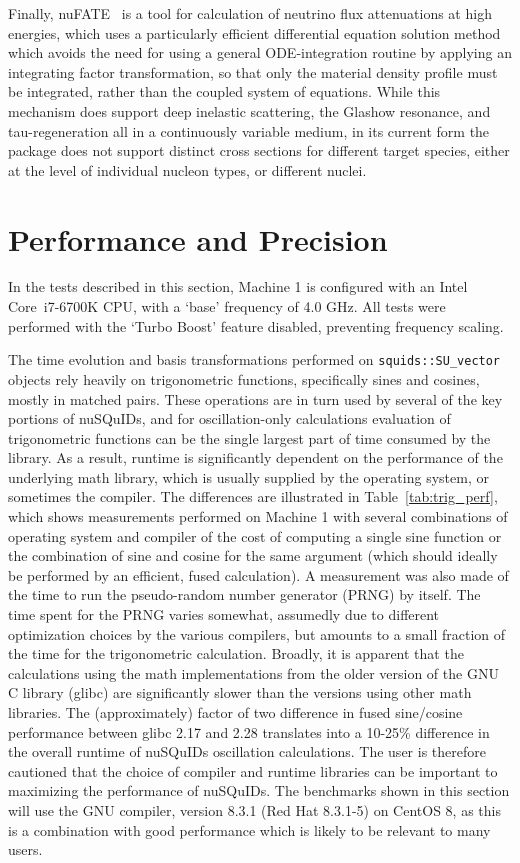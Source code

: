 \documentclass[3p,12pt]{elsarticle}
\newcommand{\ttf}{\ttfamily}
\begin{document}
Finally, nuFATE~\cite{nuFATE2017} is a tool for calculation of neutrino flux attenuations at high energies, which uses a particularly efficient differential equation solution method which avoids the need for using a general ODE-integration routine by applying an integrating factor transformation, so that only the material density profile must be integrated, rather than the coupled system of equations. 
While this mechanism does support deep inelastic scattering, the Glashow resonance, and tau-regeneration all in a continuously variable medium, in its current form the package does not support distinct cross sections for different target species, either at the level of individual nucleon types, or different nuclei. 

\section{Performance and Precision}
\label{sec:performance} 

In the tests described in this section, Machine 1 is configured with an Intel Core\texttrademark~i7-6700K CPU, with a `base' frequency of 4.0 GHz. All tests were performed with the `Turbo Boost' feature disabled, preventing frequency scaling. 

The time evolution and basis transformations performed on \lstinline{squids::SU_vector} objects rely heavily on trigonometric functions, specifically sines and cosines, mostly in matched pairs. 
These operations are in turn used by several of the key portions of {\ttf nuSQuIDs}, and for oscillation-only calculations evaluation of trigonometric functions can be the single largest part of time consumed by the library. 
As a result, runtime is significantly dependent on the performance of the underlying math library, which is usually supplied by the operating system, or sometimes the compiler. 
The differences are illustrated in Table~\ref{tab:trig_perf}, which shows measurements performed on Machine 1 with several combinations of operating system and compiler of the cost of computing a single sine function or the combination of sine and cosine for the same argument (which should ideally be performed by an efficient, fused calculation). 
A measurement was also made of the time to run the pseudo-random number generator (PRNG) by itself. 
The time spent for the PRNG varies somewhat, assumedly due to different optimization choices by the various compilers, but amounts to a small fraction of the time for the trigonometric calculation. 
Broadly, it is apparent that the calculations using the math implementations from the older version of the GNU C library (glibc) are significantly slower than the versions using other math libraries. 
The (approximately) factor of two difference in fused sine/cosine performance between glibc 2.17 and 2.28 translates into a 10-25\% difference in the overall runtime of {\ttf nuSQuIDs} oscillation calculations. 
The user is therefore cautioned that the choice of compiler and runtime libraries can be important to maximizing the performance of {\ttf nuSQuIDs}. 
The benchmarks shown in this section will use the GNU compiler, version 8.3.1 (Red Hat 8.3.1-5) on CentOS 8, as this is a combination with good performance which is likely to be relevant to many users. 
\end{document}
